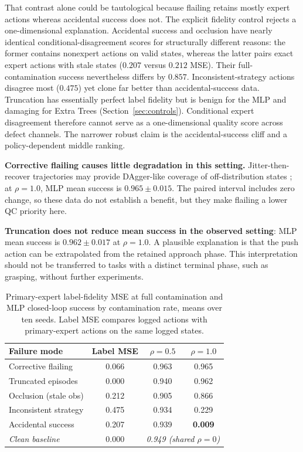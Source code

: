 \documentclass[10pt,twocolumn]{article}
\begin{document}
That contrast alone could be tautological because flailing retains mostly
expert actions whereas accidental success does not. The explicit fidelity
control rejects a one-dimensional explanation. Accidental success and
occlusion have nearly identical conditional-disagreement scores for
structurally different reasons: the former contains nonexpert actions on valid
states, whereas the latter pairs exact expert actions with stale states
($0.207$ versus $0.212$ MSE). Their full-contamination success nevertheless
differs by $0.857$. Inconsistent-strategy actions disagree most ($0.475$) yet clone far
better than accidental-success data. Truncation has essentially perfect label
fidelity but is benign for the MLP and damaging for Extra Trees
(Section~\ref{sec:controls}). Conditional expert disagreement therefore cannot
serve as a one-dimensional quality score across defect channels. The narrower
robust claim is the accidental-success cliff and a policy-dependent middle
ranking.

\textbf{Corrective flailing causes little degradation in this setting.}
Jitter-then-recover trajectories may provide DAgger-like coverage of
off-distribution states \cite{ross2011dagger}; at $\rho=1.0$, MLP mean success
is $0.965\pm0.015$. The paired interval includes zero change, so these data do
not establish a benefit, but they make flailing a lower QC priority here.

\textbf{Truncation does not reduce mean success in the observed setting}:
MLP mean success is $0.962\pm0.017$ at $\rho=1.0$. A plausible explanation is that the push action can be
extrapolated from the retained approach phase. This interpretation should not
be transferred to tasks with a distinct terminal phase, such as grasping,
without further experiments.

\begin{table}[t]
\centering
\small
\begin{tabular}{@{}lccc@{}}
\toprule
\textbf{Failure mode} & Label MSE & $\rho{=}0.5$ & $\rho{=}1.0$ \\
\midrule
Corrective flailing    & 0.066 & 0.963 & 0.965 \\
Truncated episodes     & 0.000 & 0.940 & 0.962 \\
Occlusion (stale obs)  & 0.212 & 0.905 & 0.866 \\
Inconsistent strategy  & 0.475 & 0.934 & 0.229 \\
Accidental success     & 0.207 & 0.939 & \textbf{0.009} \\
\midrule
\textit{Clean baseline} & 0.000 & \multicolumn{2}{c}{\textit{0.949 (shared $\rho=0$)}} \\
\bottomrule
\end{tabular}
\caption{Primary-expert label-fidelity MSE at full contamination and MLP
closed-loop success by contamination rate, means over ten seeds. Label MSE
compares logged actions with primary-expert actions on the same logged states.}
\label{tab:main}
\end{table}
\end{document}
